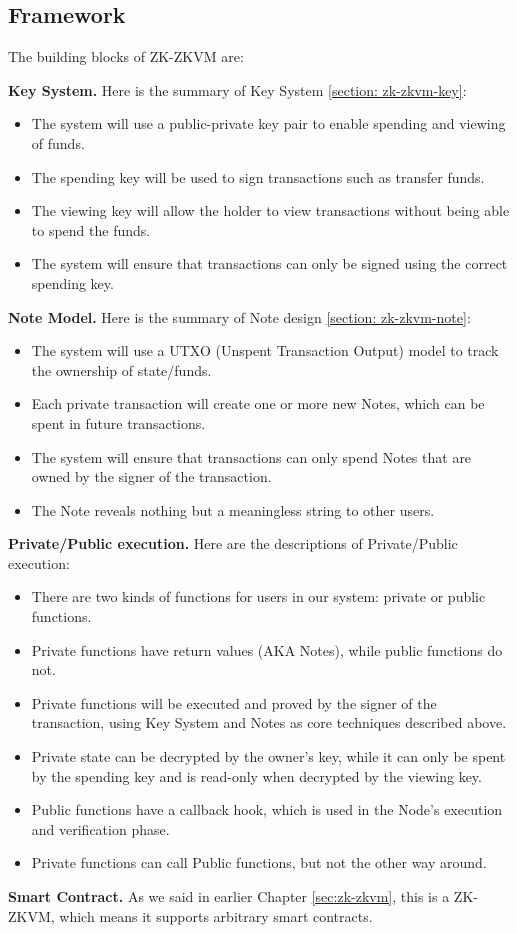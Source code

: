 \subsection{Framework}\label{section: zk-zkvm-framework}

The building blocks of ZK-ZKVM are:

\textbf{Key System.} Here is the summary of Key System \ref{section: zk-zkvm-key}:

\begin{itemize}
    \item The system will use a public-private key pair to enable spending and viewing of funds.
    \item The spending key will be used to sign transactions such as transfer funds.
    \item The viewing key will allow the holder to view transactions without being able to spend the funds.
    \item The system will ensure that transactions can only be signed using the correct spending key.
\end{itemize}
\bigskip

\textbf{Note Model.} Here is the summary of Note design \ref{section: zk-zkvm-note}:

\begin{itemize}
    \item The system will use a UTXO (Unspent Transaction Output) model to track the ownership of state/funds.
    \item Each private transaction will create one or more new Notes, which can be spent in future transactions.
    \item The system will ensure that transactions can only spend Notes that are owned by the signer of the transaction.
    \item The Note reveals nothing but a meaningless string to other users.
\end{itemize}
\bigskip

\textbf{Private/Public execution.} Here are the descriptions of Private/Public execution:

\begin{itemize}
    \item There are two kinds of functions for users in our system: private or public functions.
    \item Private functions have return values (AKA Notes), while public functions do not.
    \item Private functions will be executed and proved by the signer of the transaction, using Key System and Notes as core techniques described above.
    \item Private state can be decrypted by the owner's key, while it can only be spent by the spending key and is read-only when decrypted by the viewing key.
    \item Public functions have a callback hook, which is used in the Node's execution and verification phase.
    \item Private functions can call Public functions, but not the other way around.
\end{itemize}
\bigskip

\textbf{Smart Contract.} As we said in earlier Chapter \ref{sec:zk-zkvm}, this is a ZK-ZKVM, which means it supports arbitrary smart contracts.
